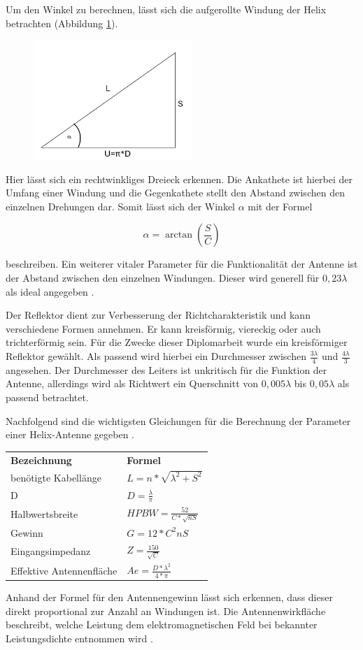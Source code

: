 Um den Winkel zu berechnen, lässt sich die aufgerollte Windung der Helix betrachten (Abbildung \ref{fig:Wndg_aufgerollt}).

\begin{figure}[H]
	\centering
	\includegraphics[width=6cm]{../ref/Windung_aufgerollt.png}
	\label{fig:Wndg_aufgerollt}
\end{figure}

Hier lässt sich ein rechtwinkliges Dreieck erkennen. Die Ankathete ist hierbei der Umfang einer Windung und die Gegenkathete stellt den Abstand zwischen den einzelnen Drehungen dar. Somit lässt sich der Winkel $\alpha$ mit der Formel

\begin{equation}
	\alpha=\arctan(\frac{S}{C})
\end{equation}

beschreiben. Ein weiterer vitaler Parameter für die Funktionalität der Antenne ist der Abstand zwischen den einzelnen Windungen. Dieser wird generell für $0,23\lambda$ als ideal angegeben \cite{Kraus-2002-AntennasB}.

Der Reflektor dient zur Verbesserung der Richtcharakteristik und kann verschiedene Formen annehmen. Er kann kreisförmig, viereckig oder auch trichterförmig sein. Für die Zwecke dieser Diplomarbeit wurde ein kreisförmiger Reflektor gewählt. Als passend wird hierbei ein Durchmesser zwischen $\frac{3\lambda}{4}$ und $\frac{4\lambda}{3}$ angesehen. Der Durchmesser des Leiters ist unkritisch für die Funktion der Antenne, allerdings wird als Richtwert ein Querschnitt von $0,005\lambda$ bis $0,05\lambda$ als passend betrachtet\cite{Kraus-2002-AntennasB}. 

Nachfolgend sind die wichtigsten Gleichungen für die Berechnung der Parameter einer Helix-Antenne gegeben \cite{Kraus-2002-AntennasB}.

\begin{table}[H]
	\begin{tabular}{l|l}

		\textbf{Bezeichnung} & \textbf{Formel}\\ 
		benötigte Kabellänge & $L=n*\sqrt{\lambda^2+S^2}$ \\
		D				     & $D=\frac{\lambda}{\pi}$\\ 
		Halbwertsbreite		 & $HPBW=\frac{52}{C*\sqrt{nS}}$ \\ 
		Gewinn               & $G=12*C^2nS$                 \\ 
		Eingangsimpedanz     & $Z=\frac{150}{\sqrt{C}}$      \\ 
		Effektive Antennenfläche    & $Ae=\frac{D*\lambda^2}{4*\pi}$ \\ 
		\end{tabular}
	\end{table}

Anhand der Formel für den Antennengewinn lässt sich erkennen, dass dieser direkt proportional zur Anzahl an Windungen ist. Die Antennenwirkfläche beschreibt, welche Leistung dem elektromagnetischen Feld bei bekannter Leistungsdichte entnommen wird \cite{Kraus-2002-AntennasB}.

